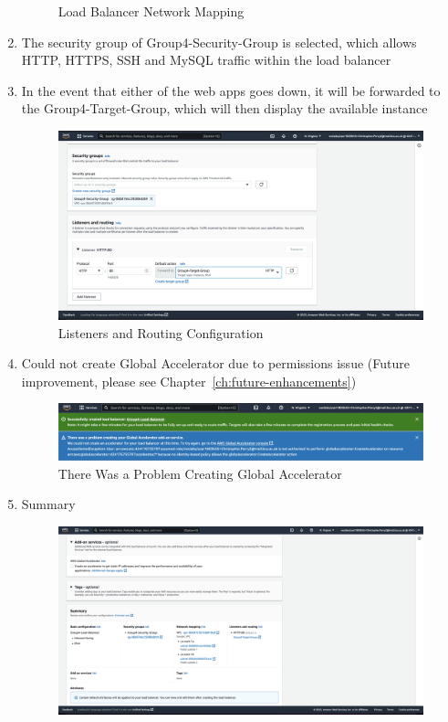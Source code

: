 \begin{enumerate}
\begin{figure}[H]
	      \caption{Load Balancer Network Mapping}
	      \label{fig:elb-networ-mapping}
	\end{figure}
	\item The security group of Group4-Security-Group is selected, which allows HTTP, HTTPS, SSH and MySQL traffic within
	      the load balancer
	\item In the event that either of the web apps goes down, it will be forwarded to the Group4-Target-Group, which will then
	      display the available instance \begin{figure}[H]
	      \centering
	      \includegraphics[width=\textwidth]{resources/elb/elb-security-groups-and-listeners.png}
	      \caption{Listeners and Routing Configuration}
	      \label{fig:elb-security-groups}
	\end{figure}
	\item Could not create Global Accelerator due to permissions issue (Future improvement, please see Chapter~\ref{ch:future-enhancements})\nolinebreak
	      \begin{figure}[H]
	      	\centering
	      	\includegraphics[width=\textwidth]{resources/elb/elb-accelerator.png}
	      	\caption{There Was a Problem Creating Global Accelerator}
	      	\label{fig:elb-accelerators}
	      \end{figure}
	\pagebreak
	\item Summary\nolinebreak
	      \begin{figure}[H]
	      	\centering
	      	\includegraphics[width=\textwidth]{resources/elb/elb-summary.png}

\end{figure}
\end{enumerate}
